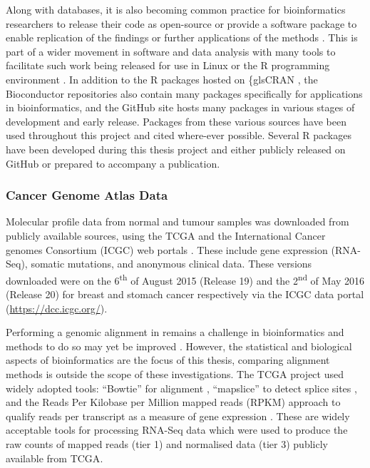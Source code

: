 Along with databases, it is also becoming common practice for \gls{bioinformatics} researchers to release their code as open-source or provide a software package to enable replication of the findings or further applications of the methods \citep{Stajich2006}. This is part of a wider movement in software and data analysis with many tools to facilitate such work being released for use in Linux or the R programming environment \citep{R_core}. In addition to the R packages hosted on \{gls{CRAN} \citep{CRAN}, the Bioconductor repositories \citep{Gentleman2004} also contain many packages specifically for applications in \gls{bioinformatics}, and the GitHub site hosts many packages in various stages of development and early release. Packages from these various sources have been used throughout this project and cited where-ever possible. Several R packages have been developed during this thesis project and either publicly released on GitHub or prepared to accompany a publication.

\subsubsection{Cancer Genome Atlas Data}
Molecular profile data from normal and tumour samples was downloaded from publicly available sources, using the \gls{TCGA} \citep{TCGA2012} and the International Cancer \Glspl{genome} Consortium (ICGC) web portals \citep{ICGC2011}. These include \gls{gene expression} (\gls{RNA-Seq}), \gls{somatic} \glspl{mutation}, and anonymous clinical data. These versions downloaded were on the 6\textsuperscript{th} of August  2015 (Release 19) and the 2\textsuperscript{nd} of May 2016 (Release 20) for breast and stomach cancer respectively via the ICGC data portal (\url{https://dcc.icgc.org/}).

Performing a \gls{genomic} alignment in remains a challenge in \gls{bioinformatics} and methods to do so may yet be improved \citep{Chen2010}. However, the statistical and biological aspects of \gls{bioinformatics} are the focus of this thesis, comparing alignment methods is outside the scope of these investigations. The \gls{TCGA} project \citep{TCGA2012} used widely adopted tools: ``Bowtie''  for alignment \citep{bowtie}, ``mapslice'' to detect splice sites \citep{mapsplice}, and the Reads Per Kilobase per Million mapped reads (RPKM) approach to qualify reads per transcript as a measure of \gls{gene expression} \citep{Mortazavi2008}. These are widely acceptable tools for processing \acrshort{RNA}-Seq data which were used to produce the raw counts of mapped reads (tier 1) and normalised  data (tier 3) publicly available from \gls{TCGA}.

